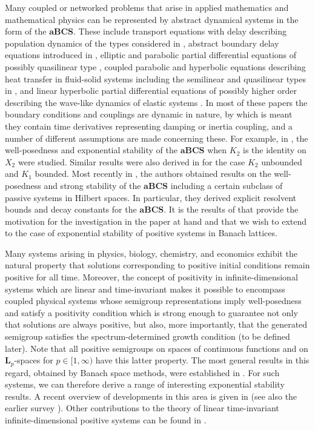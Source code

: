 \documentclass[a4paper,11pt,reqno]{amsart}
\theoremstyle{plain}
\numberwithin{equation}{section}
\begin{document}
Many coupled or networked problems that arise in applied mathematics and mathematical physics can be represented by abstract dynamical systems in the form of the $\mathbf{aBCS}$. These include transport equations with delay describing population dynamics of the types considered in \cite{MR4466961,MR3343578}, abstract boundary delay equations introduced in \cite{GANTOUH2026106307}, elliptic and parabolic partial differential equations of possibly quasilinear type \cite{MR1233197,MR1095411}, coupled parabolic and hyperbolic equations describing heat transfer in fluid-solid systems including the semilinear and quasilinear types in \cite{MR1025453,MR4876903,MR4115854}, and linear hyperbolic partial differential equations of possibly higher order describing the wave-like dynamics of elastic systems \cite{MR2105338,MR2046319,MR2421329}. In most of these papers the boundary conditions and couplings are dynamic in nature, by which is meant they contain time derivatives representing damping or inertia coupling, and a number of different assumptions are made concerning these. For example, in \cite{MR3343578}, the well-posedness and exponential stability of the $\mathbf{aBCS}$ when $K_2$ is the identity on $X_2$ were studied. Similar results were also derived in \cite{MR4466961,Boujijane2024} for the case $K_2$ unbounded and $K_1$ bounded. Most recently in \cite{MR4876903}, the authors obtained results on the well-posedness and strong stability of the $\mathbf{aBCS}$ including a certain subclass of passive systems in Hilbert spaces. In particular, they derived explicit resolvent bounds and decay constants for the $\mathbf{aBCS}$. It is the results of \cite{MR4876903} that provide the motivation for the investigation in the paper at hand and that we wish to extend to the case of exponential stability of positive systems in Banach lattices. 

Many systems arising in physics, biology, chemistry, and economics exhibit the natural property that solutions corresponding to positive initial conditions remain positive for all time. Moreover, the concept of positivity in infinite-dimensional systems which are linear and time-invariant makes it possible to encompass coupled physical systems whose semigroup representations imply well-posedness and satisfy a positivity condition which is strong enough to guarantee not only that solutions are always positive, but also, more importantly, that the generated semigroup satisfies the spectrum-determined growth condition (to be defined later). Note that all positive semigroups on spaces of continuous functions and on $\bm{L}_p$-spaces for $p \in [1,\infty)$ have this latter property. The most general results in this regard, obtained by Banach space methods, were established in \cite{MR839450,MR1273529,MR1469440}. For such systems, we can therefore derive a range of interesting exponential stability results. A recent overview of developments in this area is given in \cite{MR4841783} (see also the earlier survey \cite{MR1060534}). Other contributions to the theory of linear time-invariant infinite-dimensional positive systems can be found in \cite{MR4910475,MR3616245,Alessio2026,EZZL,elgantouh2025admissibility,MR4635044,GANTOUH2026106307,Schanbacher1989,MR4711370,Wint}.
\end{document}
